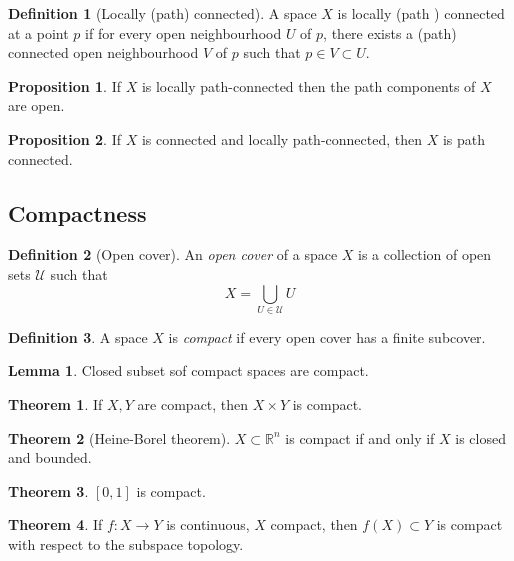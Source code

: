 \documentclass[a4paper,14pt]{extarticle}
\theoremstyle{definition}
\newtheorem*{theorem}{Theorem}
\newtheorem*{definition}{Definition}
\newtheorem*{lemma}{Lemma}
\newtheorem*{proposition}{Proposition}
\begin{document}
\begin{definition}[Locally (path) connected]
  A space $X$ is locally (path ) connected at a point $p$ if for every open neighbourhood $U$ of $p$, 
  there exists a (path) connected open neighbourhood $V$ of $p$ such that $p\in V\subset U$.
\end{definition}

\begin{proposition}
  If $X$ is locally path-connected then the path components of $X$ are open.  
\end{proposition}

\begin{proposition}
  If $X$ is connected and locally path-connected, then $X$ is path connected.
\end{proposition}


\subsection{Compactness}
\begin{definition}[Open cover]
  An \emph{open cover} of a space $X$ is a collection of open sets $\mathcal{U}$ such that
  \[X=\bigcup_{U\in\mathcal{U}}U\]
\end{definition}

\begin{definition}
  A space $X$ is \emph{compact} if every open cover has a finite subcover.
\end{definition}

\begin{lemma}
  Closed subset sof compact spaces are compact.
\end{lemma}

\begin{theorem}
  If $X,Y$ are compact, then $X\times Y$ is compact.
\end{theorem}

\begin{theorem}[Heine-Borel theorem]
  $X\subset\mathbb{R}^n$ is compact if and only if $X$ is closed and bounded.
\end{theorem}

\begin{theorem}
  $[0,1]$ is compact.
\end{theorem}

\begin{theorem}
  If $f:X\rightarrow Y$ is continuous, $X$ compact, then $f(X)\subset Y$ is compact with respect to the subspace topology.
\end{theorem}
\end{document}
